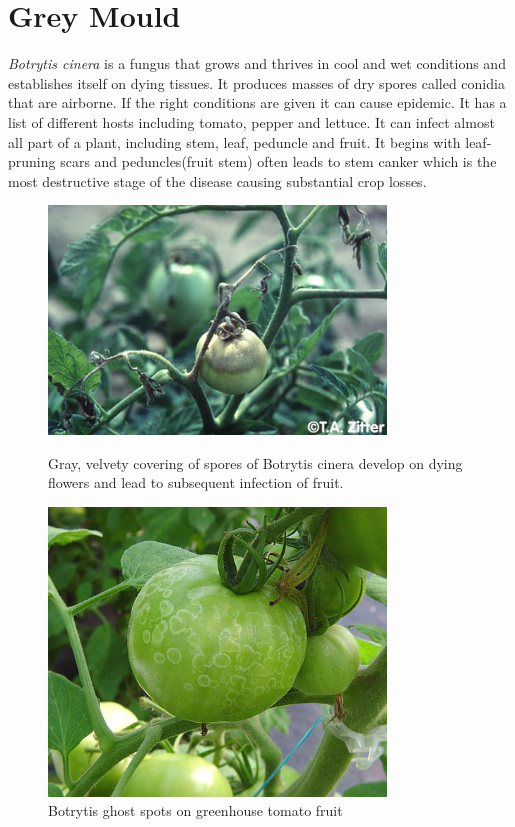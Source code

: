 \documentclass{article}
\begin{document}
\section{Grey Mould}
\textit{Botrytis cinera} is a fungus that grows and thrives in cool and wet conditions and establishes itself on dying tissues. It produces masses of dry spores called conidia that are airborne. If the right conditions are given it can cause epidemic. It has a list of different hosts including tomato, pepper and lettuce. It can infect almost all part of a plant, including stem, leaf, peduncle and fruit. It begins with leaf-pruning scars and peduncles(fruit stem) often leads to stem canker which is the most destructive stage of the disease causing substantial crop losses.

\begin{figure}
\centering
\begin{minipage}[b]{0.45\linewidth}
\includegraphics[width=0.8\textwidth]{images/botrytis-mold.jpg}
\caption{Gray, velvety covering of spores of Botrytis cinera develop on dying flowers and lead to subsequent infection of fruit.}
\end{minipage}
\quad
\begin{minipage}[b]{0.45\linewidth}
\includegraphics[width = 0.8\textwidth]{images/botrytis-ghost.jpg}
\caption{Botrytis ghost spots on greenhouse tomato fruit}
\end{minipage}
\end{figure}
\end{document}
